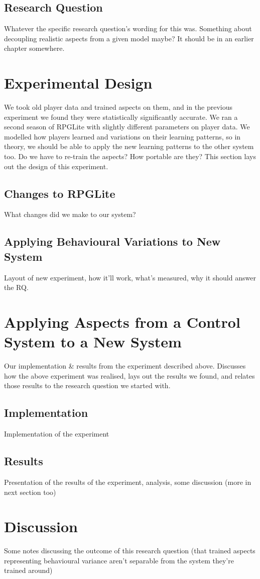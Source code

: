 \subsection{Research Question}
Whatever the specific research question's wording for this was. Something about
decoupling realistic aspects from a given model maybe? It should be in an
earlier chapter somewhere.

\section{Experimental Design}
We took old player data and trained aspects on them, and in the previous
experiment we found they were statistically significantly accurate. We ran a
second season of RPGLite with slightly different parameters on player data. We
modelled how players learned and variations on their learning patterns, so in
theory, we should be able to apply the new learning patterns to the other system
too. Do we have to re-train the aspects? How portable are they? This section
lays out the design of this experiment.


\subsection{Changes to RPGLite}
What changes did we make to our system?


\subsection{Applying Behavioural Variations to New System}
Layout of new experiment, how it'll work, what's measured, why it should answer
the RQ.


\section{Applying Aspects from a Control System to a New System}
Our implementation \& results from the experiment described above. Discusses how
the above experiment was realised, lays out the results we found, and relates
those results to the research question we started with.

\subsection{Implementation}
Implementation of the experiment

\subsection{Results}
Presentation of the results of the experiment, analysis, some discussion (more
in next section too)

\section{Discussion}
Some notes discussing the outcome of this research question (that trained
aspects representing behavioural variance aren't separable from the system
they're trained around)

